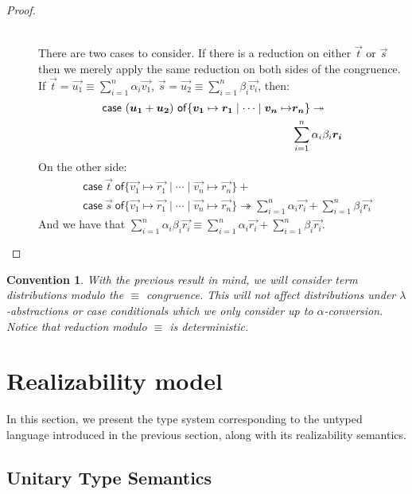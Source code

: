 \documentclass[runningheads,orivec]{llncs}
\newtheorem{convention}{Convention}
\def\gencase#1#2#3#4#5{\ensuremath{\mathsf{case}~#1~\mathsf{of} \{#2\mapsto #4 \mid \dotsb \mid #3\mapsto #5\}}}
\def\eval{\twoheadrightarrow}
\begin{document}
\begin{proof}
\begin{description}
  \item[\parbox{\linewidth}{$\gencase{(\vec{t}+\vec{s})}{\vec{v}}{\vec{w}}{\vec{r_1}}{\vec{r_n}}\equiv\\ \gencase{\vec{t}}{\vec{v_1}}{\vec{v_n}}{\vec{r_1}}{\vec{r_n}}+\\
  \gencase{\vec{s}}{\vec{v_1}}{\vec{v_n}}{\vec{r_1}}{\vec{r_n}}$:}] \hfill\\
  
  There are two cases to consider. If there is a reduction on either $\vec{t}$ or $\vec{s}$ then we merely apply the same reduction on both sides of the congruence. If $\vec{t}=\vec{u_1}\equiv \sum_{i=1}^{n}\alpha_i \vec{v_1}$, $\vec{s}=\vec{u_2}\equiv\sum_{i=1}^{n}\beta_i \vec{v_i}$, then:
  \begin{align*}
  \gencase{(\vec{u_1}+\vec{u_2})}{\vec{v_1}}{\vec{v_n}}{\vec{r_1}}{&\vec{r_n}}\eval\\
  &\sum_{i=1}^{n} \alpha_i \beta_i \vec{r_i}
  \end{align*}
  On the other side:
  \begin{align*}
    &\gencase{\vec{t}}{\vec{v_1}}{\vec{v_n}}{\vec{r_1}}{\vec{r_n}}+\\
    &\gencase{\vec{s}}{\vec{v_1}}{\vec{v_n}}{\vec{r_1}}{\vec{r_n}}\eval\sum_{i=1}^{n}\alpha_i\vec{r_i} + \sum_{i=1}^{n}\beta_i \vec{r_i}
  \end{align*}
  And we have that $\sum_{i=1}^{n} \alpha_i\beta_i\vec{r_i}\equiv\sum_{i=1}^{n}\alpha_i\vec{r_i} + \sum_{i=1}^{n}\beta_i \vec{r_i}$.
  \end{description}
  \fi
\end{proof}

\begin{convention}
  With the previous result in mind, we will consider term distributions modulo the $\equiv$ congruence. This will not affect distributions under $\lambda$-abstractions or case conditionals which we only consider up to $\alpha$-conversion. Notice that reduction modulo $\equiv$ is deterministic.
\end{convention}


\section{Realizability model}\label{sec:model}

In this section, we present the type system corresponding to the untyped language introduced in the previous section, along with its realizability semantics.

\subsection{Unitary Type Semantics}
\end{document}
